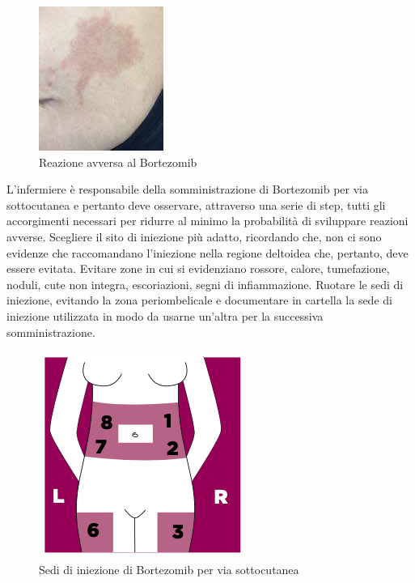 \begin{figure}[H]
    \begin{center}
    \includegraphics[width=0.3\columnwidth]{img/bortezomibreaction2.jpeg}
    \end{center}
    \caption{ Reazione avversa al Bortezomib
    \cite{BORTNURSES}}
    \label{fig:FIGURE_3.4}
\end{figure}

L’infermiere è responsabile della somministrazione di Bortezomib per via sottocutanea e pertanto deve osservare,
attraverso una serie di step, tutti gli accorgimenti necessari per ridurre al minimo la probabilità di sviluppare 
reazioni avverse. 
Scegliere il sito di iniezione più adatto, ricordando che, non ci sono evidenze che raccomandano l’iniezione 
nella regione deltoidea che, pertanto, deve essere evitata. Evitare zone in cui si evidenziano rossore, calore, 
tumefazione, noduli, cute non integra, escoriazioni, segni di infiammazione. Ruotare le sedi di iniezione, evitando 
la zona periombelicale e documentare in cartella la sede di iniezione utilizzata in modo da usarne 
un’altra per la successiva somministrazione\cite{BORTNURSES}.\\

\begin{figure}[H]
    \begin{center}
    \includegraphics[width=0.3\columnwidth]{img/SEDI.png}
    \end{center}
    \caption{ Sedi di iniezione di Bortezomib per via sottocutanea
    \cite{BORTEZOMIB}}

\end{figure}


